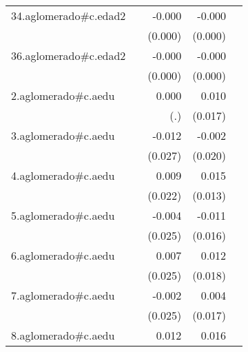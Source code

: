 {\begin{longtable}{l*{4}{D{.}{.}{-1}}}
\addlinespace
34.aglomerado#c.edad2&                     &      -0.000         &      -0.000\sym{***}&                     \\
            &                     &     (0.000)         &     (0.000)         &                     \\
\addlinespace
36.aglomerado#c.edad2&                     &      -0.000         &      -0.000\sym{***}&                     \\
            &                     &     (0.000)         &     (0.000)         &                     \\
\addlinespace
2.aglomerado#c.aedu&                     &       0.000         &       0.010         &                     \\
            &                     &         (.)         &     (0.017)         &                     \\
\addlinespace
3.aglomerado#c.aedu&                     &      -0.012         &      -0.002         &                     \\
            &                     &     (0.027)         &     (0.020)         &                     \\
\addlinespace
4.aglomerado#c.aedu&                     &       0.009         &       0.015         &                     \\
            &                     &     (0.022)         &     (0.013)         &                     \\
\addlinespace
5.aglomerado#c.aedu&                     &      -0.004         &      -0.011         &                     \\
            &                     &     (0.025)         &     (0.016)         &                     \\
\addlinespace
6.aglomerado#c.aedu&                     &       0.007         &       0.012         &                     \\
            &                     &     (0.025)         &     (0.018)         &                     \\
\addlinespace
7.aglomerado#c.aedu&                     &      -0.002         &       0.004         &                     \\
            &                     &     (0.025)         &     (0.017)         &                     \\
\addlinespace
8.aglomerado#c.aedu&                     &       0.012         &       0.016         &                     \\

\end{longtable}}
